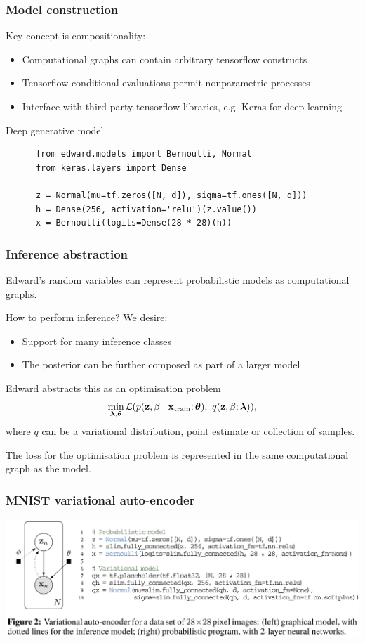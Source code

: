 \documentclass[10pt]{beamer}
\begin{document}
\begin{frame}[fragile]
  \frametitle{Model construction}
  Key concept is compositionality:
  \begin{itemize}
    \item Computational graphs can contain arbitrary tensorflow constructs
    \item Tensorflow conditional evaluations permit nonparametric processes
    \item Interface with third party tensorflow libraries, e.g. Keras for deep learning
  \end{itemize}
  \begin{block}{Deep generative model}
    \begin{verbatim}
      from edward.models import Bernoulli, Normal
      from keras.layers import Dense

      z = Normal(mu=tf.zeros([N, d]), sigma=tf.ones([N, d]))
      h = Dense(256, activation='relu')(z.value())
      x = Bernoulli(logits=Dense(28 * 28)(h))
    \end{verbatim}
  \end{block}
\end{frame}


\begin{frame}
  \frametitle{Inference abstraction}
  Edward's random variables can represent probabilistic models as computational graphs.

  How to perform inference? We desire:
  \begin{itemize}
    \item Support for many inference classes
    \item The posterior can be further composed as part of a larger model
  \end{itemize}

  Edward abstracts this as an optimisation problem
  \begin{align*}
    \label{eq:inference-optimization}
    \min_{\boldsymbol{\mathbf{\lambda}},\boldsymbol{\mathbf{\theta}}}
    \mathcal{L}(
      p(\mathbf{z}, \beta\mid \mathbf{x}_{\text{train}}; \boldsymbol{\mathbf{\theta}}),~
      q(\mathbf{z}, \beta; \boldsymbol{\mathbf{\lambda}})
    ),
  \end{align*}
  where $q$ can be a variational distribution, point estimate or collection of samples.

  The loss for the optimisation problem is represented in the same computational graph as the model.

\end{frame}


\begin{frame}
  \frametitle{MNIST variational auto-encoder}
  \includegraphics[width=\textwidth]{img/edward-vae.png}
\end{frame}
\end{document}
